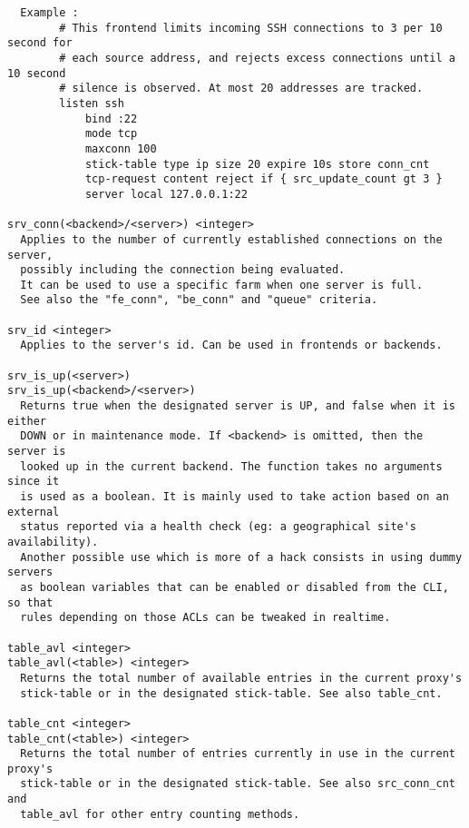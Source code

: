 \begin{verbatim}
  Example :
        # This frontend limits incoming SSH connections to 3 per 10 second for
        # each source address, and rejects excess connections until a 10 second
        # silence is observed. At most 20 addresses are tracked.
        listen ssh
            bind :22
            mode tcp
            maxconn 100
            stick-table type ip size 20 expire 10s store conn_cnt
            tcp-request content reject if { src_update_count gt 3 }
            server local 127.0.0.1:22

srv_conn(<backend>/<server>) <integer>
  Applies to the number of currently established connections on the server,
  possibly including the connection being evaluated.
  It can be used to use a specific farm when one server is full.
  See also the "fe_conn", "be_conn" and "queue" criteria.

srv_id <integer>
  Applies to the server's id. Can be used in frontends or backends.

srv_is_up(<server>)
srv_is_up(<backend>/<server>)
  Returns true when the designated server is UP, and false when it is either
  DOWN or in maintenance mode. If <backend> is omitted, then the server is
  looked up in the current backend. The function takes no arguments since it
  is used as a boolean. It is mainly used to take action based on an external
  status reported via a health check (eg: a geographical site's availability).
  Another possible use which is more of a hack consists in using dummy servers
  as boolean variables that can be enabled or disabled from the CLI, so that
  rules depending on those ACLs can be tweaked in realtime.

table_avl <integer>
table_avl(<table>) <integer>
  Returns the total number of available entries in the current proxy's
  stick-table or in the designated stick-table. See also table_cnt.

table_cnt <integer>
table_cnt(<table>) <integer>
  Returns the total number of entries currently in use in the current proxy's
  stick-table or in the designated stick-table. See also src_conn_cnt and
  table_avl for other entry counting methods.


\end{verbatim}
